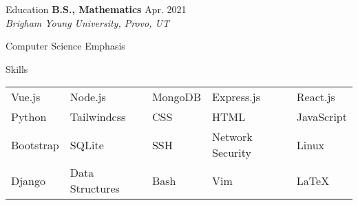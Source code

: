 \documentclass{resume} %
\begin{document}
\begin{rSection}{Education}
{\bf B.S., Mathematics }\hfill {Apr. 2021} \\
\textit{Brigham Young University, Provo, UT}
    \begin{compactitem}
        \item Computer Science Emphasis
    \end{compactitem}
\end{rSection}

\begin{rSection}{Skills}
        \begin{tabular}{ l l l l l }
            Vue.js & Node.js     & MongoDB  & Express.js & React.js  \\  
            Python & Tailwindcss &  CSS & HTML & JavaScript \\
            Bootstrap & SQLite   & SSH  & Network Security & Linux  \\
            Django & Data Structures & Bash & Vim & \LaTeX  
        \end{tabular}
\end{rSection}
\end{document}
